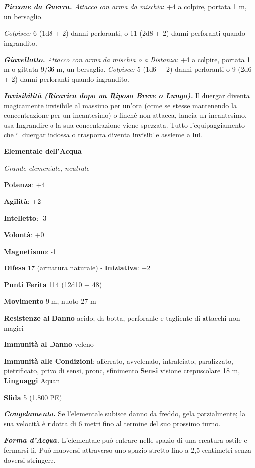 \begin{multicols}{2}
\emph{\textbf{Piccone da Guerra.} Attacco con arma da mischia}: +4 a
colpire, portata 1 m, un bersaglio.

\emph{Colpisce:} 6 (1d8 + 2) danni perforanti, o 11 (2d8 + 2) danni
perforanti quando ingrandito.

\emph{\textbf{Giavellotto.} Attacco con arma da mischia o a Distanza}:
+4 a colpire, portata 1 m o gittata 9/36 m, un bersaglio.
\emph{Colpisce:} 5 (1d6 + 2) danni perforanti o 9 (2d6 + 2) danni
perforanti quando ingrandito.

\emph{\textbf{Invisibilità (Ricarica dopo un Riposo Breve o Lungo).}} Il
duergar diventa magicamente invisibile al massimo per un'ora (come se
stesse mantenendo la concentrazione per un incantesimo) o finché non
attacca, lancia un incantesimo, usa Ingrandire o la sua concentrazione
viene spezzata. Tutto l'equipaggiamento che il duergar indossa o
trasporta diventa invisibile assieme a lui.

\textbf{Elementale dell'Acqua}

\emph{Grande elementale, neutrale}

\textbf{Potenza}: +4

\textbf{Agilità}: +2

\textbf{Intelletto}: -3

\textbf{Volontà}: +0

\textbf{Magnetismo}: -1

\textbf{Difesa} 17 (armatura naturale) - \textbf{Iniziativa}: +2

\textbf{Punti Ferita} 114 (12d10 + 48)

\textbf{Movimento} 9 m, nuoto 27 m

\textbf{Resistenze al Danno} acido; da botta, perforante e tagliente
di attacchi non magici

\textbf{Immunità al Danno} veleno

\textbf{Immunità alle Condizioni}: afferrato, avvelenato, intralciato,
paralizzato, pietrificato, privo di sensi, prono, sfinimento
\textbf{Sensi} visione crepuscolare 18 m, 
\textbf{Linguaggi} Aquan

\textbf{Sfida} 5 (1.800 PE)\smallskip

\emph{\textbf{Congelamento.}} Se l'elementale subisce danno da freddo,
gela parzialmente; la sua velocità è ridotta di 6 metri fino al termine
del suo prossimo turno.

\emph{\textbf{Forma d'Acqua.}} L'elementale può entrare nello spazio di
una creatura ostile e fermarsi lì. Può muoversi attraverso uno spazio
stretto fino a 2,5 centimetri senza doversi stringere.


\end{multicols}
